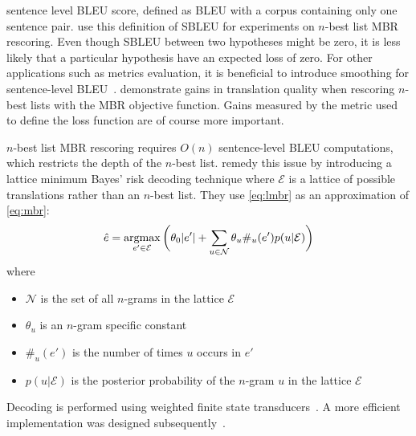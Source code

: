 sentence level BLEU score, defined as BLEU with a corpus containing
only one sentence pair. \citet{kumar-byrne:2004:NAACL} use
this definition of SBLEU for experiments on $n$-best list
MBR rescoring. Even though
SBLEU between two hypotheses might be zero, it is less likely
that a particular hypothesis have an expected loss of zero.
For other applications such as metrics evaluation, it is beneficial
to introduce smoothing for sentence-level
BLEU~\citep{lin-och:2004:COLING}. %
\citet{kumar-byrne:2004:NAACL} demonstrate gains in translation quality
when rescoring $n$-best lists %
with the MBR objective function. Gains measured by the metric used
to define the loss function are of course more important.

$n$-best list MBR rescoring requires $O(n)$ sentence-level
BLEU computations, which restricts the depth of the $n$-best list.
\citet{tromble-kumar-och-macherey:2008:EMNLP} remedy this issue
by introducing a
lattice minimum Bayes' risk decoding technique where $\mathcal{E}$ is a lattice
of possible translations rather than an $n$-best list.
They use \autoref{eq:lmbr} as an approximation
of \autoref{eq:mbr}:
%
\begin{equation} \label{eq:lmbr}
  \hat{e} = \operatorname*{argmax}_{e' \in \mathcal{E}} \bigg ( \theta_0 |e'| + \sum_{u \in \mathcal{N}} \theta_u \#_u(e') p(u|\mathcal{E}) \bigg )
\end{equation}
%
where
%
\begin{itemize}
  \item $\mathcal{N}$ is the set of all $n$-grams in the lattice $\mathcal{E}$
  \item $\theta_u$ is an $n$-gram specific constant
  \item $\#_u(e')$ is the number of times $u$ occurs in $e'$
  \item $p(u|\mathcal{E})$ is the posterior probability of the $n$-gram $u$ in the lattice $\mathcal{E}$
\end{itemize}
%
Decoding is performed using weighted finite state
transducers~\citep{tromble-kumar-och-macherey:2008:EMNLP}. A more efficient
implementation was designed
subsequently~\citep{blackwood-degispert-byrne:2010:ACL,blackwood:2010:PHD}.


